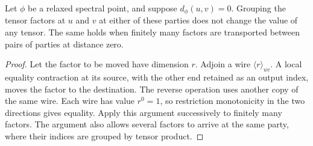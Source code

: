 \begin{lemma}
\label{lem:zero-wire-identification}
Let $\phi$ be a relaxed spectral point, and suppose
$d_\phi(u,v)=0$. Grouping the tensor factors at $u$ and $v$ at
either of these parties does not change the value of any tensor.
The same holds when finitely many factors are transported between
pairs of parties at distance zero.
\end{lemma}
\begin{proof}
Let the factor to be moved have dimension $r$. Adjoin a wire
$\langle r\rangle_{uv}$. A local equality contraction at its
source, with the other end retained as an output index, moves the
factor to the destination. The reverse operation uses another
copy of the same wire. Each wire has value $r^0=1$, so restriction
monotonicity in the two directions gives equality. Apply this
argument successively to finitely many factors. The argument also
allows several factors to arrive at the same party, where their
indices are grouped by tensor product.
\end{proof}


